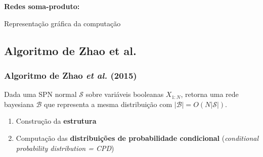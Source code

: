 \documentclass[dvipsnames]{beamer}
\begin{document}
\begin{frame}
\begin{minipage}{0.5\textwidth}
{
      }

      \textbf{Redes soma-produto:}

      Representação gráfica da computação
    \end{minipage}
  \end{frame}

  \subsection{Algoritmo de Zhao et al.}

  \begin{frame}
    \frametitle{Algoritmo de Zhao \emph{et al.} (2015)}

    Dada uma SPN normal $\mathcal{S}$ sobre variáveis booleanas $X_{1:N}$, retorna uma rede bayesiana $\mathcal{B}$ que representa a mesma distribuição com $|\mathcal{B}| = O(N|\mathcal{S}|)$.

    \vspace{1em}

    \begin{enumerate}
      \item Construção da \textbf{estrutura}
      \item Computação das \textbf{distribuições de probabilidade condicional} (\emph{conditional probability distribution = CPD})
    \end{enumerate}
  \end{frame}
\end{document}
